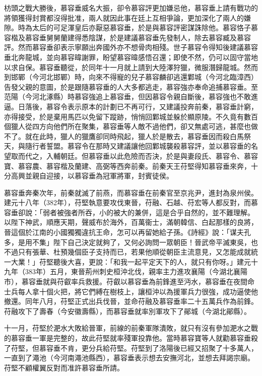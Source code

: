 枋頭之戰大勝後，慕容垂威名大振，卻令慕容評更加嫌忌他，慕容垂上請有戰功的將領獲得封賞都沒得批准，兩人就因此事在廷上互相爭論，更加深化了兩人的嫌隙。時為太后的可足渾皇后亦厭惡慕容垂，於是與慕容評密謀誅除他。慕容恪子慕容楷及慕容垂舅舅蘭建得悉陰謀，於是建議慕容垂先發制人，除去慕容臧及慕容評。然而慕容垂卻表示寧願出奔國外亦不想骨肉相殘。世子慕容令得知後建議慕容垂北奔龍城，並向慕容暐謝罪，盼望慕容暐感悟召還；即使不然，仍可以固守當地以求自保。慕容垂聽從，於同年十一月就上請到大陸澤狩獵，微服潛歸龍城。然而到邯鄲（今河北邯鄲）時，向來不得寵的兒子慕容麟卻逃還鄴城（今河北臨漳西）告發父親的意圖，於是跟隨慕容垂的人大多都逃走，慕容強亦奉命追捕慕容垂。至范陽（今河北涿縣）時慕容強追上慕容垂，但因慕容令親自斷後，慕容強也不敢進逼。日落後，慕容令表示原本的計劃已不再可行，又建議投奔前秦，慕容垂計窮，亦得接受，於是棄用馬匹以免留下蹤跡，悄悄回鄴城並躲於顯原陵。不久竟有數百個獵人從四方向他們所在聚集，慕容垂等人敵不過他們，卻又無處可逃，甚麼也做不了。就在此時，獵人的獵鷹卻同時飛起，獵人於是散去，慕容垂因而殺白馬祭天，與隨行者誓盟。慕容令在那時又建議讓他回鄴城襲殺慕容評，並以慕容垂的名望取而代之，入輔朝廷。但慕容垂以此危險而否決，於是與妻段氏、慕容令、慕容寶、慕容農、慕容楷及蘭建、高弼等西奔前秦。前秦天王苻堅得知慕容垂來奔，十分高興並親自迎接，以慕容垂為冠軍將軍，封賓徒侯。

慕容垂奔秦次年，前秦就滅了前燕，而慕容垂在前秦官至京兆尹，進封為泉州侯。建元十八年（382年），苻堅執意要攻伐東晉，苻融、石越、苻宏等人都反對，而慕容垂卻說：「弱者被強者所吞，小的被大的兼併，這是合乎自然的，並不難理解。以陛下神武，順應天期，聲威布於海外，百萬衞士，滿朝韓信、白起那樣的良將，晉這個於江南的小國獨獨違抗王命，怎可以再留她給子孫。《詩經》說：「谋夫孔多，是用不集」陛下自己決定就夠了，又何必詢問一眾朝臣！晉武帝平滅東吳，也不過只有張華、杜預幾個臣子支持而已，若果他順從朝臣主流意見，又怎能成就統一大業！」苻堅聽後大喜，更說：「和我一起平定天下的人，就只有你呀。」建元十九年（383年）五月，東晉荊州刺史桓沖北伐，親率主力進攻襄陽（今湖北襄陽市），慕容垂就與苻叡率兵救援。苻叡以慕容垂為前鋒進至沔水，慕容垂在夜間命士兵每人拿十個火把，將它們縛在樹枝上，讓桓沖以為援軍兵力很強，成功逼使他撤還。同年八月，苻堅正式出兵伐晉，並命苻融及慕容垂率二十五萬兵作為前鋒。苻融攻下了壽春（今安徽壽縣），而慕容垂就率別軍攻下了鄖城（今湖北鄖縣）。

十一月，苻堅於淝水大敗給晉軍，前線的前秦軍隊潰敗，就只有沒有參加淝水之戰的慕容垂一軍是完整的，故此苻堅就率殘軍投靠他。當時慕容寶等人就勸慕容垂殺了苻堅，但慕容垂不肯，更分兵給苻堅。苻堅到了洛陽後已經又招聚了十多萬人，一直到了澠池（今河南澠池縣西），慕容垂表示想去安撫河北，並想去拜謁宗廟。苻堅不顧權翼反對而准許慕容垂所請。

